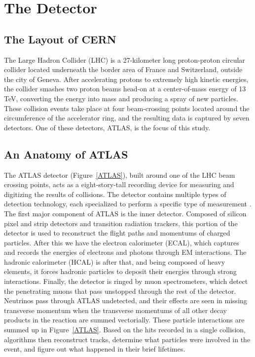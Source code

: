 \chapter{The Detector}

\section{The Layout of CERN}

The Large Hadron Collider (LHC) is a 27-kilometer long proton-proton circular collider located underneath the border area of France and Switzerland, outside the city of Geneva. After accelerating protons to extremely high kinetic energies, the collider smashes two proton beams head-on at a center-of-mass energy of 13 TeV, converting the energy into mass and producing a spray of new particles. These collision events take place at four beam-crossing points located around the circumference of the accelerator ring, and the resulting data is captured by seven detectors. One of these detectors, ATLAS, is the focus of this study.

\section{An Anatomy of ATLAS}

The ATLAS detector (Figure~\ref{ATLAS}), built around one of the LHC beam crossing points, acts as a eight-story-tall recording device for measuring and digitizing the results of collisions. The detector contains multiple types of detection technology, each specialized to perform a specific type of measurement \cite{ATLAS_website}. The first major component of ATLAS is the inner detector. Composed of silicon pixel and strip detectors and transition radiation trackers, this portion of the detector is used to reconstruct the flight paths and momentums of charged particles. After this we have the electron calorimeter (ECAL), which captures and records the energies of electrons and photons through EM interactions. The hadronic calorimeter (HCAL) is after that, and being composed of heavy elements, it forces hadronic particles to deposit their energies through strong interactions. Finally, the detector is ringed by muon spectrometers, which detect the penetrating muons that pass unstopped through the rest of the detector. Neutrinos pass through ATLAS undetected, and their effects are seen in missing transverse momentum when the transverse momentums of all other decay products in the reaction are summed vectorially. These particle interactions are summed up in Figure~\ref{ATLAS}. Based on the hits recorded in a single collision, algorithms then reconstruct tracks, determine what particles were involved in the event, and figure out what happened in their brief lifetimes.

